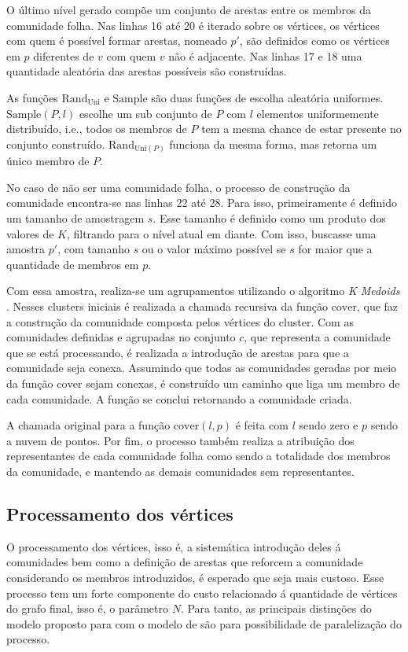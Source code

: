 \documentclass[notes.tex]{subfiles}
\begin{document}
O último nível gerado compõe um conjunto de arestas entre os membros da comunidade folha.
Nas linhas 16 até 20 é iterado sobre os vértices, os vértices com quem é possível formar arestas, nomeado $p'$, são definidos como os vértices em $p$ diferentes de $v$ com quem $v$ não é adjacente.
Nas linhas 17 e 18 uma quantidade aleatória das arestas possíveis são construídas.

As funções $\text{Rand}_{\text{Uni}}$ e $\text{Sample}$ são duas funções de escolha aleatória uniformes.
$\text{Sample}(P, l)$ escolhe um sub conjunto de $P$ com $l$ elementos uniformemente distribuído, i.e., todos os membros de $P$ tem a mesma chance de estar presente no conjunto construído.
$\text{Rand}_{\text{Uni}(P)}$ funciona da mesma forma, mas retorna um único membro de $P$.

No caso de não ser uma comunidade folha, o processo de construção da comunidade encontra-se nas linhas 22 até 28.
Para isso, primeiramente é definido um tamanho de amostragem $s$.
Esse tamanho é definido como um produto dos valores de $K$, filtrando para o nível atual em diante.
Com isso, buscasse uma amostra $p'$, com tamanho  $s$ ou o valor máximo possível se  $s$ for maior que a quantidade de membros em  $p$.

Com essa amostra, realiza-se um agrupamentos utilizando o algoritmo \emph{K Medoids} \cite{largeron2015generating}.
Nesses clusters iniciais é realizada a chamada recursiva da função $\text{cover}$, que faz a construção da comunidade composta pelos vértices do cluster.
Com as comunidades definidas e agrupadas no conjunto $c$, que representa a comunidade que se está processando, é realizada a introdução de arestas para que a comunidade seja conexa.
Assumindo que todas as comunidades geradas por meio da função  $\text{cover}$ sejam conexas, é construído um caminho que liga um membro de cada comunidade.
A função se conclui retornando a comunidade criada.

A chamada original para a função $\text{cover}(l, p)$ é feita com $l$ sendo zero e  $p$ sendo a nuvem de pontos.
Por fim, o processo também realiza a atribuição dos representantes de cada comunidade folha como sendo a totalidade dos membros da comunidade, e mantendo as demais comunidades sem representantes.

\subsection{Processamento dos vértices}

O processamento dos vértices, isso é, a sistemática introdução deles á comunidades bem como a definição de arestas que reforcem a comunidade considerando os membros introduzidos, é esperado que seja mais custoso.
Esse processo tem um forte componente do custo relacionado á quantidade de vértices do grafo final, isso é, o parâmetro $N$.
Para tanto, as principais distinções do modelo proposto para com o modelo de  são para possibilidade de paralelização do processo.
\end{document}
